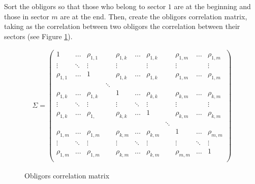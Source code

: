 \documentclass[a4paper,12pt,final]{article}
\begin{document}
Sort the obligors so that those who belong to sector $1$ are at the beginning 
and those in sector $m$ are at the end. Then, create the obligors correlation 
matrix, taking as the correlation between two obligors the correlation between 
their sectors (see Figure \ref{obligorcorrel}).

\begin{figure}[h!]
\begin{displaymath}
\begin{array}{c}
\Sigma=
\left(
\begin{array}{ccccccccccc}
1           & \dots    & \rho_{1,1}  &          & \rho_{1,k}  & \dots   & \rho_{1,k}  &         & \rho_{1,m}  & \dots      & \rho_{1,m}  \\
\vdots      & \ddots   & \vdots      &          & \vdots      &         & \vdots      &         & \vdots      &            & \vdots      \\
\rho_{1,1}  & \dots    & 1           &          & \rho_{1,k}  & \dots   & \rho_{1,k}  &         & \rho_{1,m}  & \dots      & \rho_{1,m}  \\

            &          &             & \ddots   &             &         &             &         &             &            &             \\

\rho_{1,k}  & \dots    & \rho_{1,k}  &          & 1           & \dots   & \rho_{k,k}  &         & \rho_{k,m}  & \dots      & \rho_{k,m}  \\
\vdots      & \ddots   & \vdots      &          & \vdots      & \ddots  & \vdots      &         & \vdots      &            & \vdots      \\
\rho_{1,k}  & \dots    & \rho_{1, }  &          & \rho_{k,k}  & \dots   & 1           &         & \rho_{k,m}  & \dots      & \rho_{k,m}  \\

            &          &             &          &             &         &             & \ddots  &             &            &             \\

\rho_{1,m}  & \dots    & \rho_{1,m}  &          & \rho_{k,m}  & \dots   & \rho_{k,m}  &         & 1           & \dots      & \rho_{m,m}  \\
\vdots      & \ddots   & \vdots      &          & \vdots      & \ddots  & \vdots      &         & \vdots      & \ddots     & \vdots      \\
\rho_{1,m}  & \dots    & \rho_{1,m}  &          & \rho_{k,m}  & \dots   & \rho_{k,m}  &         & \rho_{m,m}  & \dots      & 1           \\
\end{array}
\right)
\end{array}
\end{displaymath}
\caption{Obligors correlation matrix}
\label{obligorcorrel}
\end{figure}
\end{document}
